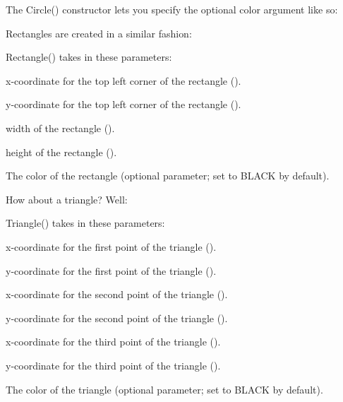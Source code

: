 The {\ttfamily Circle()} constructor lets you specify the optional color argument like so\+:


\begin{DoxyCode}{0}
\end{DoxyCode}


Rectangles are created in a similar fashion\+:


\begin{DoxyCode}{0}
\end{DoxyCode}


{\ttfamily Rectangle()} takes in these parameters\+:


\begin{DoxyItemize}
\item x-\/coordinate for the top left corner of the rectangle ({}).
\item y-\/coordinate for the top left corner of the rectangle ({}).
\item width of the rectangle ({}).
\item height of the rectangle ({}).
\item The color of the rectangle (optional parameter; set to {\ttfamily B\+L\+A\+CK} by default).
\end{DoxyItemize}

How about a triangle? Well\+:


\begin{DoxyCode}{0}
\end{DoxyCode}


{\ttfamily Triangle()} takes in these parameters\+:


\begin{DoxyItemize}
\item x-\/coordinate for the first point of the triangle ({}).
\item y-\/coordinate for the first point of the triangle ({}).
\item x-\/coordinate for the second point of the triangle ({}).
\item y-\/coordinate for the second point of the triangle ({}).
\item x-\/coordinate for the third point of the triangle ({}).
\item y-\/coordinate for the third point of the triangle ({}).
\item The color of the triangle (optional parameter; set to {\ttfamily B\+L\+A\+CK} by default).
\end{DoxyItemize}

